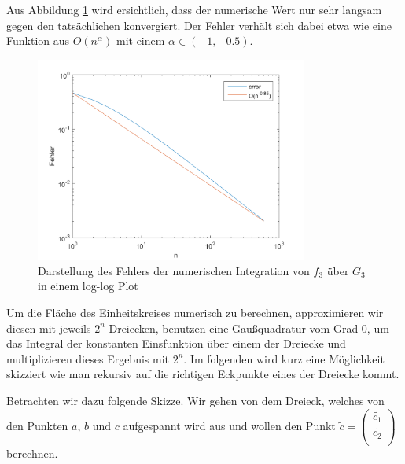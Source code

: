\documentclass[a4paper,11pt,bibliography=totoc,listof=totoc,headinclude=true,cleardoublepage=empty,oneside]{scrbook}
\begin{document}
Aus Abbildung \ref{fig:3_5_3} wird ersichtlich, dass der numerische Wert nur sehr langsam gegen den tatsächlichen konvergiert. Der Fehler verhält sich dabei etwa wie eine Funktion aus $O(n^\alpha)$ mit einem $\alpha \in (-1,-0.5)$. 
	
\begin{figure}[h]
	\centering
	\includegraphics[width=0.8\textwidth]{plot_3_5_3.png}
	\caption{Darstellung des Fehlers der numerischen Integration von $f_3$ über $G_3$ in einem log-log Plot}
	\label{fig:3_5_3}
\end{figure}
	

\pagebreak Um die Fläche des Einheitskreises numerisch zu berechnen, approximieren wir diesen mit jeweils $2^n$ Dreiecken, benutzen eine Gaußquadratur vom Grad 0, um das Integral der  konstanten Einsfunktion über einem der Dreiecke und multiplizieren dieses Ergebnis mit $2^n$. Im folgenden wird kurz eine Möglichkeit skizziert wie man rekursiv auf die richtigen Eckpunkte eines der Dreiecke kommt.

\noindent Betrachten wir dazu folgende Skizze. Wir gehen von dem Dreieck, welches von den Punkten $a$, $b$ und $c$ aufgespannt wird aus und wollen den Punkt $\tilde{c} = \left(\begin{array}{ccc}
	\tilde{c_1} \\
	\tilde{c_2}\\
\end{array}\right)$ berechnen.

\vspace{14mm}
\hspace{2.7cm}
\\
\end{document}
